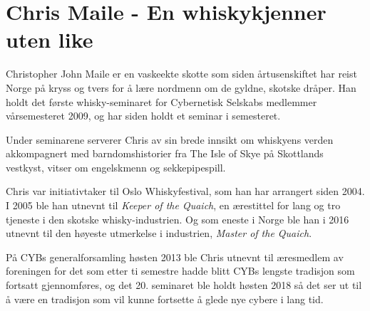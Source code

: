 \chapter{Chris Maile - En whiskykjenner uten like}

\author{Skrevet av Torgeir Lebesbye}

Christopher John Maile er en vaskeekte skotte som siden årtusenskiftet har reist Norge på kryss og tvers for å lære nordmenn om de gyldne, skotske dråper. Han holdt det første whisky-seminaret for Cybernetisk Selskabs medlemmer vårsemesteret 2009, og har siden holdt et seminar i semesteret.

Under seminarene serverer Chris av sin brede innsikt om whiskyens verden akkompagnert med barndomshistorier fra The Isle of Skye på Skottlands vestkyst, vitser om engelskmenn og sekkepipespill.

Chris var initiativtaker til Oslo Whiskyfestival, som han har arrangert siden 2004. I 2005 ble han utnevnt til \textit{Keeper of the Quaich}, en ærestittel for lang og tro tjeneste i den skotske whisky-industrien. Og som eneste i Norge ble han i 2016 utnevnt til den høyeste utmerkelse i industrien, \textit{Master of the Quaich}.

På CYBs generalforsamling høsten 2013 ble Chris utnevnt til æresmedlem av foreningen for det som etter ti semestre hadde blitt CYBs lengste tradisjon som fortsatt gjennomføres, og det 20. seminaret ble holdt høsten 2018 så det ser ut til å være en tradisjon som vil kunne fortsette å glede nye cybere i lang tid.